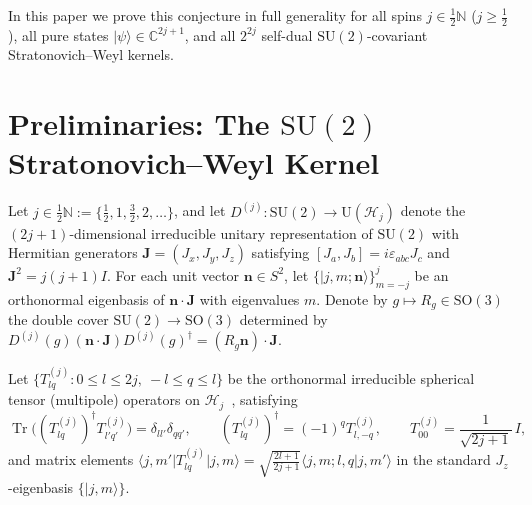 \documentclass[11pt,a4paper]{article}
\theoremstyle{remark}
\newcommand{\ket}[1]{\lvert #1 \rangle}
\newcommand{\bra}[1]{\langle #1 \rvert}
\newcommand{\braket}[2]{\langle #1 \vert #2 \rangle}
\newcommand{\Tr}{\operatorname{Tr}}
\newcommand{\bn}{\mathbf{n}}
\newcommand{\bJ}{\mathbf{J}}
\begin{document}
In this paper we prove this conjecture in full generality for all spins $j \in \frac{1}{2}\mathbb{N}$ ($j \ge \frac{1}{2}$), all pure states $\ket{\psi} \in \mathbb{C}^{2j+1}$, and all $2^{2j}$ self-dual $\mathrm{SU}(2)$-covariant Stratonovich--Weyl kernels.

\section{Preliminaries: The \texorpdfstring{$\mathrm{SU}(2)$}{SU(2)} Stratonovich--Weyl Kernel}

Let $j \in \frac{1}{2}\mathbb{N} := \{\frac{1}{2}, 1, \frac{3}{2}, 2, \dots\}$, and let $D^{(j)} : \mathrm{SU}(2) \to \mathrm{U}(\mathcal{H}_j)$ denote the $(2j+1)$-dimensional irreducible unitary representation of $\mathrm{SU}(2)$ with Hermitian generators $\bJ = (J_x, J_y, J_z)$ satisfying $[J_a, J_b] = i\varepsilon_{abc} J_c$ and $\bJ^2 = j(j+1)I$. For each unit vector $\bn \in S^2$, let $\{\ket{j,m;\bn}\}_{m=-j}^{j}$ be an orthonormal eigenbasis of $\bn \cdot \bJ$ with eigenvalues $m$. Denote by $g \mapsto R_g \in \mathrm{SO}(3)$ the double cover $\mathrm{SU}(2) \to \mathrm{SO}(3)$ determined by $D^{(j)}(g)(\bn\cdot\bJ)D^{(j)}(g)^\dagger = (R_g \bn)\cdot\bJ$.

Let $\{T^{(j)}_{lq} : 0 \le l \le 2j,\ -l \le q \le l\}$ be the orthonormal irreducible spherical tensor (multipole) operators on $\mathcal{H}_j$~\cite{VarillyGraciaBondia1989,Davis2021}, satisfying
\begin{equation}
\Tr\!\big((T^{(j)}_{lq})^\dagger T^{(j)}_{l'q'}\big) = \delta_{ll'}\delta_{qq'}, \qquad
(T^{(j)}_{lq})^\dagger = (-1)^q T^{(j)}_{l,-q}, \qquad
T^{(j)}_{00} = \frac{1}{\sqrt{2j+1}}\,I,
\end{equation}
and matrix elements $\bra{j,m'} T^{(j)}_{lq} \ket{j,m} = \sqrt{\frac{2l+1}{2j+1}} \braket{j,m; l,q}{j,m'}$ in the standard $J_z$-eigenbasis $\{\ket{j,m}\}$.
\end{document}

